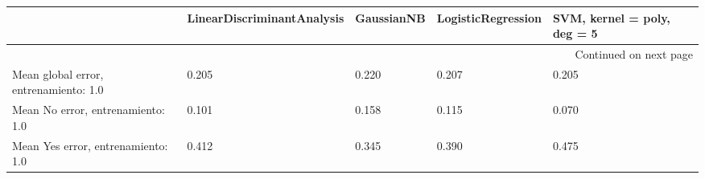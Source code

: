 \begin{longtable}{p{4cm}|p{1.5cm}|p{1.5cm}|p{1.5cm}|p{1.5cm}}
\toprule
{} &  LinearDiscriminantAnalysis &  GaussianNB &  LogisticRegression &  SVM, kernel = poly, deg = 5 \\
\midrule
\endhead
\midrule
\multicolumn{5}{r}{{Continued on next page}} \\
\midrule
\endfoot

\bottomrule
\endlastfoot
Mean global error, entrenamiento: 1.0 &                       0.205 &       0.220 &               0.207 &                        0.205 \\
Mean No error, entrenamiento: 1.0     &                       0.101 &       0.158 &               0.115 &                        0.070 \\
Mean Yes error, entrenamiento: 1.0    &                       0.412 &       0.345 &               0.390 &                        0.475 \\
\end{longtable}

